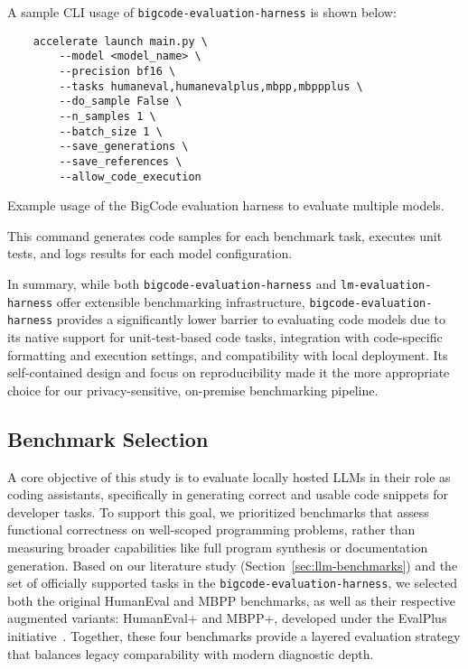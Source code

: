A sample CLI usage of \texttt{bigcode-evaluation-harness} is shown below:

\begin{listing}[H]
	\begin{verbatim}    
    accelerate launch main.py \
        --model <model_name> \
        --precision bf16 \
        --tasks humaneval,humanevalplus,mbpp,mbppplus \
        --do_sample False \
        --n_samples 1 \
        --batch_size 1 \
        --save_generations \
        --save_references \
        --allow_code_execution

\end{verbatim}
	\caption{Example usage of the BigCode evaluation harness to evaluate multiple models.}
	\label{lst:bceh}
\end{listing}

This command generates code samples for each benchmark task, executes unit tests, and logs results for each model configuration.

In summary, while both \texttt{bigcode-evaluation-harness} and \texttt{lm-evaluation-harness} offer extensible benchmarking infrastructure, \texttt{bigcode-evaluation-harness} provides a significantly lower barrier to evaluating code models due to its native support for unit-test-based code tasks, integration with code-specific formatting and execution settings, and compatibility with local deployment. Its self-contained design and focus on reproducibility made it the more appropriate choice for our privacy-sensitive, on-premise benchmarking pipeline.

\subsection{Benchmark Selection}
\label{sec:benchmarks}

A core objective of this study is to evaluate locally hosted \glspl{LLM} in their role as coding assistants, specifically in generating correct and usable code snippets for developer tasks. To support this goal, we prioritized benchmarks that assess functional correctness on well-scoped programming problems, rather than measuring broader capabilities like full program synthesis or documentation generation. Based on our literature study (Section~\ref{sec:llm-benchmarks}) and the set of officially supported tasks in the \texttt{bigcode-evaluation-harness}, we selected both the original HumanEval and \gls{MBPP} benchmarks, as well as their respective augmented variants: HumanEval+ and \gls{MBPP}+, developed under the EvalPlus initiative~\autocite{Liu2023Rigorous}. Together, these four benchmarks provide a layered evaluation strategy that balances legacy comparability with modern diagnostic depth.

